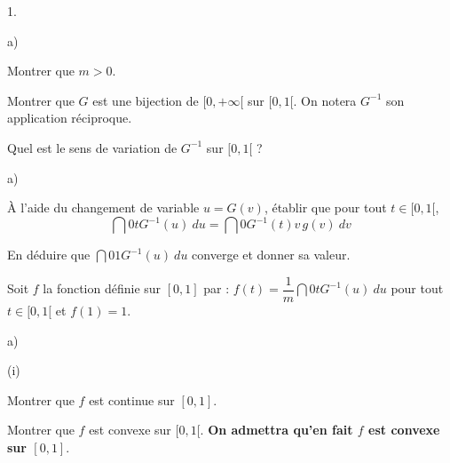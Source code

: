 \begin{noliste}{1.}
 \setlength{\itemsep}{4mm}
 \setcounter{enumi}{5}
 \item 
 \begin{noliste}{a)}
  \setlength{\itemsep}{2mm}
  \item Montrer que $m >0$.
  
  

  
  \item Montrer que $G$ est une bijection de $[0,+\infty[$ sur $[0,1[$. 
  On notera $G^{-1}$ son application réciproque.
  
  

  
  \item Quel est le sens de variation de $G^{-1}$ sur $[0,1[$ ?
  
  
 \end{noliste}
 
 \item
 \begin{noliste}{a)}
  \setlength{\itemsep}{2mm}
  \item À l'aide du changement de variable $u=G(v)$, établir que pour 
  tout $t \in [0,1[$, 
  \[
   \dint{0}{t} G^{-1}(u) \ du= \dint{0}{G^{-1}(t)} v \, g(v) \ dv
  \]
  
  
  
  \item En déduire que $\dint{0}{1} G^{-1}(u) \ du$ converge et donner 
  sa valeur. 
  
  

 \end{noliste}
 

\newpage


 \item Soit $f$ la fonction définie sur $[0,1]$ par : $f(t)= 
 \dfrac{1}{m} \dint{0}{t} G^{-1}(u) \ du$ pour tout $t \in [0,1[$ et 
 $f(1)=1$.
 \begin{noliste}{a)}
  \setlength{\itemsep}{2mm}
  \item 
  \begin{nonoliste}{(i)}
   \item Montrer que $f$ est continue sur $[0,1]$. 
   
   

   
   
   
   
   
   
   \item Montrer que $f$ est convexe sur $[0,1[$. \textbf{On admettra 
   qu'en fait $f$ est convexe sur $[0,1]$}. 
   

\end{nonoliste}
\end{noliste}
\end{noliste}
